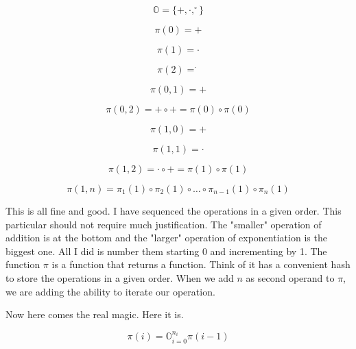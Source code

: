 \documentclass[12pt]{article}
\begin{document}
\begin{equation}
    \mathbb{O} = \{+, \cdot, ^\circ\}
\end{equation}

\begin{equation}
    \pi(0) = +
\end{equation}

\begin{equation}
    \pi(1) = \cdot
\end{equation}

\begin{equation}
    \pi(2) = ^\cdot
\end{equation}

\begin{equation}
    \pi(0,1) = +
\end{equation}

\begin{equation}
    \pi(0,2) = + \circ + = \pi(0) \circ \pi(0)
\end{equation}

\begin{equation}
    \pi(1,0) = +
\end{equation}

\begin{equation}
    \pi(1,1) = \cdot
\end{equation}

\begin{equation}
    \pi(1,2) = \cdot \circ + = \pi(1) \circ \pi(1)
\end{equation}

\begin{equation}
    \pi(1,n) = \pi_1(1) \circ \pi_2(1) \circ \dots \circ \pi_{n-1}(1) \circ \pi_n(1)
\end{equation}

This is all fine and good. I have sequenced the operations in a given order.
This particular should not require much justification. The "smaller" operation
of addition is at the bottom and the "larger" operation of exponentiation is
the biggest one. All I did is number them starting 0 and incrementing by 1. The
function $\pi$ is a function that returns a function. Think of it has a
convenient hash to store the operations in a given order. When we add $n$ as
second operand to $\pi$, we are adding the ability to iterate our operation.

Now here comes the real magic. Here it is.

\begin{equation}
    \pi(i) = \mathbb{O}_{i=0}^{n_i} \pi(i-1)
    \label{eq:pi-reduc}
\end{equation}
\end{document}
